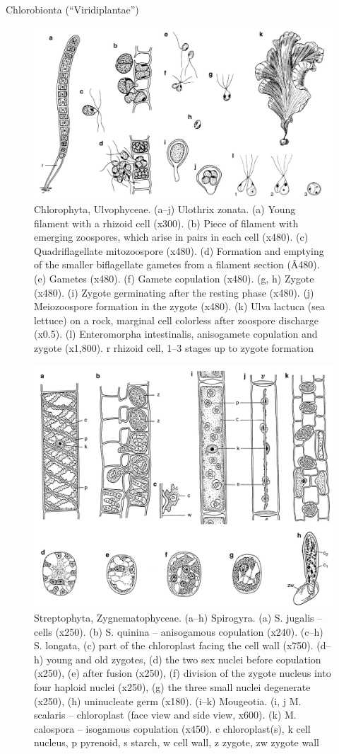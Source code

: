 \documentclass[ignorenonframetext,aspectratio=169]{beamer}
\begin{document}
\begin{frame}{Chlorobionta (``Viridiplantae'')}
\protect\hypertarget{chlorobionta-viridiplantae}{}

\begin{figure}
\includegraphics[width=0.4\linewidth]{./../images/chlorophyta_ulvophyceae} \caption{Chlorophyta, Ulvophyceae. (a–j) Ulothrix zonata. (a) Young filament with a rhizoid cell (x300). (b) Piece of filament with emerging zoospores, which arise in pairs in each cell (x480). (c) Quadriflagellate mitozoospore (x480). (d) Formation and emptying of the smaller biflagellate gametes from a filament section (Â480). (e) Gametes (x480). (f) Gamete copulation (x480). (g, h) Zygote (x480). (i) Zygote germinating after the resting phase (x480). (j) Meiozoospore formation in the zygote (x480). (k) Ulva lactuca (sea lettuce) on a rock, marginal cell colorless after zoospore discharge (x0.5). (l) Enteromorpha intestinalis, anisogamete copulation and zygote (x1,800). r rhizoid cell, 1–3 stages up to zygote formation}\label{fig:chlorobionta}
\end{figure}

\end{frame}

\begin{frame}{}
\protect\hypertarget{section-14}{}

\begin{figure}
\includegraphics[width=0.45\linewidth]{./../images/streptophyta_spirogyra} \caption{Streptophyta, Zygnematophyceae. (a–h) Spirogyra. (a) S. jugalis – cells (x250). (b) S. quinina – anisogamous copulation (x240). (c–h) S. longata, (c) part of the chloroplast facing the cell wall (x750). (d–h) young and old zygotes, (d) the two sex nuclei before copulation (x250), (e) after fusion (x250), (f) division of the zygote nucleus into four haploid nuclei (x250), (g) the three small nuclei degenerate (x250), (h) uninucleate germ (x180). (i–k) Mougeotia. (i, j M. scalaris – chloroplast (face view and side view, x600). (k) M. calospora – isogamous copulation (x450). c chloroplast(s), k cell nucleus, p pyrenoid, s starch, w cell wall, z zygote, zw zygote wall}\label{fig:chlorobionta-spirogyra}
\end{figure}

\end{frame}
\end{document}
